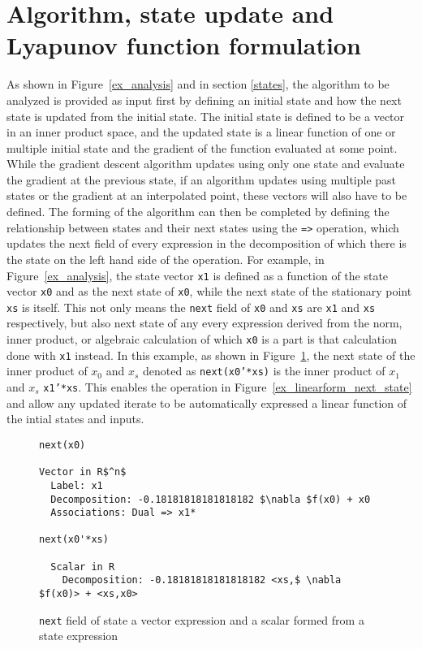 \section{Algorithm, state update and Lyapunov function formulation}
As shown in Figure~\ref{ex_analysis} and in section \ref{states}, the algorithm to be analyzed is provided as input first by defining an initial state and how the next state is updated from the initial state. The initial state is defined to be a vector in an inner product space, and the updated state is a linear function of one or multiple initial state and the gradient of the function evaluated at some point. While the gradient descent algorithm updates using only one state and evaluate the gradient at the previous state, if an algorithm updates using multiple past states or the gradient at an interpolated point, these vectors will also have to be defined. The forming of the algorithm can then be completed by defining the relationship between states and their next states using the \texttt{=>} operation, which updates the next field of every expression in the decomposition of which there is the state on the left hand side of the operation. For example, in Figure~\ref{ex_analysis}, the state vector \texttt{x1} is defined as a function of the state vector \texttt{x0} and as the next state of \texttt{x0}, while the next state of the stationary point \texttt{xs} is itself. This not only means the \texttt{next} field of \texttt{x0} and \texttt{xs} are \texttt{x1} and \texttt{xs} respectively, but also next state of any every expression derived from the norm, inner product, or algebraic calculation of which \texttt{x0} is a part is that calculation done with \texttt{x1} instead. In this example, as shown in Figure~\ref{ex_next}, the next state of the inner product of $x_0$ and $x_s$ denoted as \texttt{next(x0'*xs)} is the inner product of $x_1$ and $x_s$ \texttt{x1'*xs}. This enables the operation in Figure~\ref{ex_linearform_next_state} and allow any updated iterate to be automatically expressed a linear function of the intial states and inputs.
\begin{figure}[h!]
	\begin{lstlisting}[mathescape]
next(x0)

Vector in R$^n$
  Label: x1
  Decomposition: -0.18181818181818182 $\nabla $f(x0) + x0
  Associations: Dual => x1*

next(x0'*xs)

  Scalar in R
    Decomposition: -0.18181818181818182 <xs,$ \nabla $f(x0)> + <xs,x0>
\end{lstlisting}
\caption{\texttt{next} field of state a vector expression and a scalar formed from a state expression}
\label{ex_next}
\end{figure}

